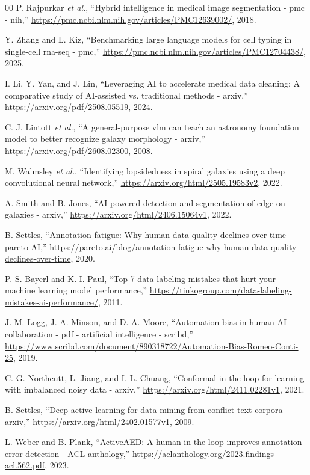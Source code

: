 \documentclass[10pt, conference, letterpaper]{IEEEtran}
\begin{document}
\begin{thebibliography}{00}
 P. Rajpurkar \textit{et al.}, ``Hybrid intelligence in medical image segmentation - pmc - nih,'' \url{https://pmc.ncbi.nlm.nih.gov/articles/PMC12639002/}, 2018.

 Y. Zhang and L. Kiz, ``Benchmarking large language models for cell typing in single-cell rna-seq - pmc,'' \url{https://pmc.ncbi.nlm.nih.gov/articles/PMC12704438/}, 2025.

 I. Li, Y. Yan, and J. Lin, ``Leveraging AI to accelerate medical data cleaning: A comparative study of AI-assisted vs. traditional methods - arxiv,'' \url{https://arxiv.org/pdf/2508.05519}, 2024.

 C. J. Lintott \textit{et al.}, ``A general-purpose vlm can teach an astronomy foundation model to better recognize galaxy morphology - arxiv,'' \url{https://arxiv.org/pdf/2608.02300}, 2008.

 M. Walmsley \textit{et al.}, ``Identifying lopsidedness in spiral galaxies using a deep convolutional neural network,'' \url{https://arxiv.org/html/2505.19583v2}, 2022.

 A. Smith and B. Jones, ``AI-powered detection and segmentation of edge-on galaxies - arxiv,'' \url{https://arxiv.org/html/2406.15064v1}, 2022.

 B. Settles, ``Annotation fatigue: Why human data quality declines over time - pareto AI,'' \url{https://pareto.ai/blog/annotation-fatigue-why-human-data-quality-declines-over-time}, 2020.

 P. S. Bayerl and K. I. Paul, ``Top 7 data labeling mistakes that hurt your machine learning model performance,'' \url{https://tinkogroup.com/data-labeling-mistakes-ai-performance/}, 2011.

 J. M. Logg, J. A. Minson, and D. A. Moore, ``Automation bias in human-AI collaboration - pdf - artificial intelligence - scribd,'' \url{https://www.scribd.com/document/890318722/Automation-Bias-Romeo-Conti-25}, 2019.

 C. G. Northcutt, L. Jiang, and I. L. Chuang, ``Conformal-in-the-loop for learning with imbalanced noisy data - arxiv,'' \url{https://arxiv.org/html/2411.02281v1}, 2021.

 B. Settles, ``Deep active learning for data mining from conflict text corpora - arxiv,'' \url{https://arxiv.org/html/2402.01577v1}, 2009.

 L. Weber and B. Plank, ``ActiveAED: A human in the loop improves annotation error detection - ACL anthology,'' \url{https://aclanthology.org/2023.findings-acl.562.pdf}, 2023.

\end{thebibliography}
\end{document}
